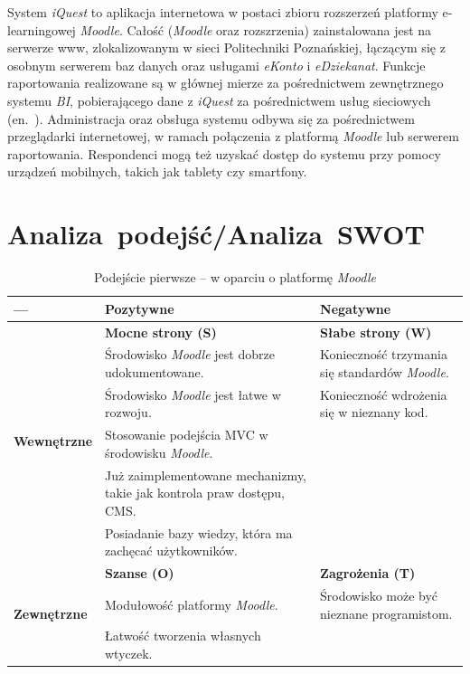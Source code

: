 System \textit{iQuest} to aplikacja internetowa w postaci zbioru rozszerzeń platformy e-learningowej \textit{Moodle}. Całość (\textit{Moodle} oraz rozszrzenia) zainstalowana jest na serwerze www, zlokalizowanym w sieci Politechniki Poznańskiej, łączącym się z osobnym serwerem baz danych oraz usługami \textit{eKonto} i \textit{eDziekanat}. Funkcje raportowania realizowane są w głównej mierze za pośrednictwem zewnętrznego systemu \textit{BI}, pobierającego dane z \textit{iQuest} za pośrednictwem usług sieciowych (en.~). Administracja oraz obsługa systemu odbywa się za pośrednictwem przeglądarki internetowej, w ramach połączenia z platformą \textit{Moodle} lub serwerem raportowania. Respondenci mogą też uzyskać dostęp do systemu przy pomocy urządzeń mobilnych, takich jak tablety czy smartfony.

\section{Analiza~podejść\slash Analiza~SWOT}
\label{Chapter53}

\begin{table}[H]
\centering
\begin{tabular}{ | p{2.5cm} | p{5.5cm} | p{5.5cm} | }
\hline
--- & \textbf{Pozytywne} & \textbf{Negatywne} \\ \hline
\multirow{6}{*}{\textbf{Wewnętrzne}} & \textbf{Mocne strony (S)} & \textbf{Słabe strony (W)} \\
			& Środowisko \textit{Moodle} jest dobrze udokumentowane. & Konieczność trzymania się standardów \textit{Moodle}. \\
			& Środowisko \textit{Moodle} jest łatwe w rozwoju. & Konieczność wdrożenia się w nieznany kod. \\
			& Stosowanie podejścia MVC w środowisku \textit{Moodle}. & \\
			& Już zaimplementowane mechanizmy, takie jak kontrola praw dostępu, CMS. & \\
			& Posiadanie bazy wiedzy, która ma zachęcać użytkowników. & \\ \hline
%					
\multirow{3}{*}{\textbf{Zewnętrzne}} & \textbf{Szanse (O)} & \textbf{Zagrożenia (T)} \\
				& Modułowość platformy \textit{Moodle}. & Środowisko może być nieznane programistom. \\
				& Łatwość tworzenia własnych wtyczek. & \\ \hline
\end{tabular}
\caption{Podejście pierwsze -- w oparciu o platformę \textit{Moodle}}\label{tab:SWOT1}
\end{table}

